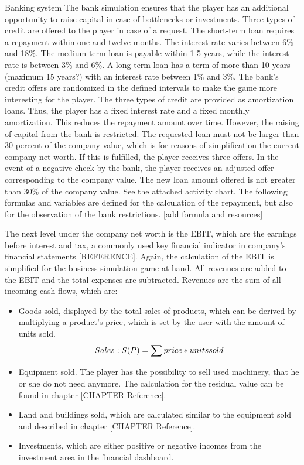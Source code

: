 Banking system
The bank simulation ensures that the player has an additional opportunity to raise capital in case of bottlenecks or investments. Three types of credit are offered to the player in case of a request. 
The short-term loan requires a repayment within one and twelve months. The interest rate varies between 6\% and 18\%. The medium-term loan is payable within 1-5 years, while the interest rate is between 3\% and 6\%. A long-term loan has a term of more than 10 years (maximum 15 years?) with an interest rate between 1\% and 3\%. The bank's credit offers are randomized in the defined intervals to make the game more interesting for the player. The three types of credit are provided as amortization loans. Thus, the player has a fixed interest rate and a fixed monthly amortization. This reduces the repayment amount over time.
However, the raising of capital from the bank is restricted.
The requested loan must not be larger than 30 percent of the company value, which is for reasons of simplification the current company net worth. If this is fulfilled, the player receives three offers. In the event of a negative check by the bank, the player receives an adjusted offer corresponding to the company value. The new loan amount offered is not greater than 30\% of the company value. See the attached activity chart. 
The following formulas and variables are defined for the calculation of the repayment, but also for the observation of the bank restrictions. [add formula and resources]

The next level under the company net worth is the EBIT, which are the earnings before interest and tax, a commonly used key financial indicator in company's financial statements [REFERENCE]. Again, the calculation of the EBIT is simplified for the business simulation game at hand. All revenues are added to the EBIT and the total expenses are subtracted. Revenues are the sum of all incoming cash flows, which are:
\begin{itemize}
    \item Goods sold, displayed by the total sales of products, which can be derived by multiplying a product’s price, which is set by the user with the amount of units sold.
    \begin{equation}
        Sales: S(P) = \sum price\index{Product} * units sold
    \end{equation}
    \item Equipment sold. The player has the possibility to sell used machinery, that he or she do not need anymore. The calculation for the residual value can be found in chapter [CHAPTER Reference].
    \item Land and buildings sold, which are calculated similar to the equipment sold and described in chapter [CHAPTER Reference].
    \item Investments, which are either positive or negative incomes from the investment area in the financial dashboard.
\end{itemize}

